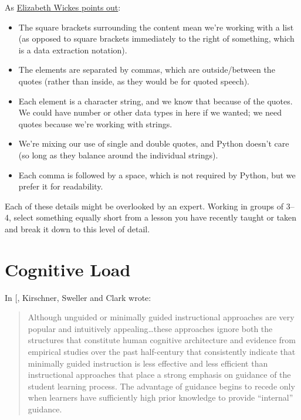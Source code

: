 As \href{https://twitter.com/elliewix/status/981285432922202113}{Elizabeth Wickes points out}:

\begin{itemize}
\item
  The square brackets surrounding the content mean we're working with
  a list (as opposed to square brackets immediately to the right of
  something, which is a data extraction notation).
\item
  The elements are separated by commas, which are outside/between the
  quotes (rather than inside, as they would be for quoted speech).
\item
  Each element is a character string, and we know that because of the
  quotes. We could have number or other data types in here if we
  wanted; we need quotes because we're working with strings.
\item
  We're mixing our use of single and double quotes, and Python doesn't
  care (so long as they balance around the individual strings).
\item
  Each comma is followed by a space, which is not required by Python,
  but we prefer it for readability.
\end{itemize}

Each of these details might be overlooked by an expert. Working in
groups of 3--4, select something equally short from a lesson you have
recently taught or taken and break it down to this level of detail.

\chapter{Cognitive Load}\label{s:load}

In {[}\protect[\hyperlink{b:Kirs2006}{Kirs2006}]{]}, Kirschner, Sweller and Clark wrote:

\begin{quote}\setlength{\parindent}{0pt}
Although unguided or minimally guided instructional approaches are
very popular and intuitively appealing\ldots{}these approaches
ignore both the structures that constitute human cognitive
architecture and evidence from empirical studies over the past
half-century that consistently indicate that minimally guided
instruction is less effective and less efficient than instructional
approaches that place a strong emphasis on guidance of the student
learning process. The advantage of guidance begins to recede only when
learners have sufficiently high prior knowledge to provide ``internal''
guidance.
\end{quote}

